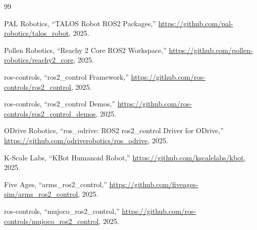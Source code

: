\documentclass[12pt,a4paper]{article}
\begin{document}
\begin{thebibliography}{99}

    PAL Robotics, ``TALOS Robot ROS2 Packages,''
    \url{https://github.com/pal-robotics/talos_robot}, 2025.

    Pollen Robotics, ``Reachy 2 Core ROS2 Workspace,''
    \url{https://github.com/pollen-robotics/reachy2_core}, 2025.

    ros-controls, ``ros2\_control Framework,''
    \url{https://github.com/ros-controls/ros2_control}, 2025.

    ros-controls, ``ros2\_control Demos,''
    \url{https://github.com/ros-controls/ros2_control_demos}, 2025.

    ODrive Robotics, ``ros\_odrive: ROS2 ros2\_control Driver for ODrive,''
    \url{https://github.com/odriverobotics/ros_odrive}, 2025.

    K-Scale Labs, ``KBot Humanoid Robot,''
    \url{https://github.com/kscalelabs/kbot}, 2025.

    Five Ages, ``arms\_ros2\_control,''
    \url{https://github.com/fiveages-sim/arms_ros2_control}, 2025.

    ros-controls, ``mujoco\_ros2\_control,''
    \url{https://github.com/ros-controls/mujoco_ros2_control}, 2025.

\end{thebibliography}
\end{document}

